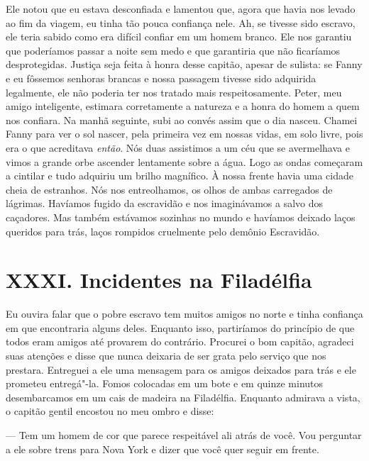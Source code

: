 Ele notou que eu estava desconfiada e
lamentou que, agora que havia nos levado ao fim da viagem, eu tinha tão
pouca confiança nele. Ah, se tivesse sido escravo, ele teria sabido como
era difícil confiar em um homem branco. Ele nos garantiu que poderíamos
passar a noite sem medo e que garantiria que não ficaríamos
desprotegidas. Justiça seja feita à honra desse capitão, apesar de
sulista: se Fanny e eu fôssemos senhoras brancas e nossa passagem
tivesse sido adquirida legalmente, ele não poderia ter nos tratado mais
respeitosamente. Peter, meu amigo inteligente, estimara corretamente a
natureza e a honra do homem a quem nos confiara. Na manhã seguinte, subi
ao convés assim que o dia nasceu. Chamei Fanny para ver o sol nascer,
pela primeira vez em nossas vidas, em solo livre, pois era o que
acreditava \emph{então}. Nós duas assistimos a um céu que se avermelhava
e vimos a grande orbe ascender lentamente sobre a água. Logo as ondas
começaram a cintilar e tudo adquiriu um brilho magnífico. À nossa frente
havia uma cidade cheia de estranhos. Nós nos entreolhamos, os olhos de
ambas carregados de lágrimas. Havíamos fugido da escravidão e nos
imaginávamos a salvo dos caçadores. Mas também estávamos sozinhas no
mundo e havíamos deixado laços queridos para trás, laços rompidos
cruelmente pelo demônio Escravidão.

\chapter{XXXI. Incidentes na
Filadélfia}

Eu ouvira falar que o pobre escravo tem
muitos amigos no norte e tinha confiança em que encontraria alguns
deles. Enquanto isso, partiríamos do princípio de que todos eram amigos
até provarem do contrário. Procurei o bom capitão, agradeci suas
atenções e disse que nunca deixaria de ser grata pelo serviço que nos
prestara. Entreguei a ele uma mensagem para os amigos deixados para trás
e ele prometeu entregá"-la. Fomos colocadas em um bote e em quinze
minutos desembarcamos em um cais de madeira na Filadélfia. Enquanto
admirava a vista, o capitão gentil encostou no meu ombro e disse:

--- Tem um homem de cor que parece respeitável ali atrás de você. Vou
perguntar a ele sobre trens para Nova York e dizer que você quer seguir
em frente.

